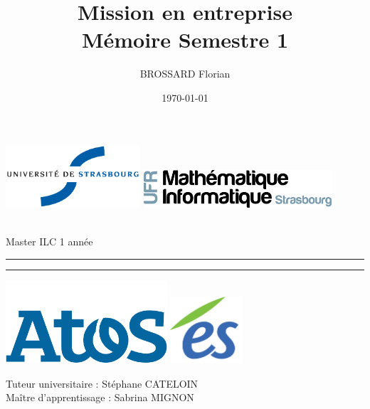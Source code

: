 \documentclass[12pt]{report}
\title{Mission en entreprise \\ Mémoire Semestre 1}
\author{BROSSARD Florian}
\date{\today}
\newcommand{\schoolyear}{Master ILC 1\iere{} année}
\def\thanks{
    Tuteur universitaire : Stéphane CATELOIN\\
    Maître d'apprentissage : Sabrina MIGNON
}
\begin{document}
    
    \makeatletter
    \begin{titlepage}
		\enlargethispage{2cm}
		\begin{center}
			\includegraphics[width = 50mm]{img/unistra.jpg} \hfill
			\includegraphics[width = 70mm]{img/logoUFRMath.png} 
		\end{center}
		
		\begin{center}
			\vspace*{3cm}
			\LARGE{\@author\\}
			\large{\schoolyear \\ \@date}
			\vspace*{1cm}
			\hrule
			\vspace*{0.5em}
			\textsc{\LARGE{ \@title }}
			\vspace*{1em}
			\hrule
		\end{center}
		\begin{center}
			\vspace{1.5cm}
			\includegraphics[width = 60mm]{img/atos.png} \hfill
			\includegraphics[height = 25mm]{img/es.jpg} \\
			\vspace{2cm}
			\thanks
		\end{center}
	\end{titlepage}
    \makeatother
    
    \listoftodos\thispagestyle{empty}
    \newpage
    
\end{document}
